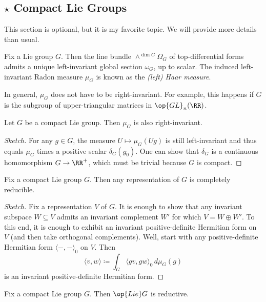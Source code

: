 \documentclass{article}
\begin{document}
\subsection{\texorpdfstring{$\star$}{\textasteriskcentered{}} Compact Lie Groups} \label{subsec:compact}
\begin{warn}
	This section is optional, but it is my favorite topic. We will provide more details than usual.
\end{warn}
\begin{definition}
	Fix a Lie group $G$. Then the line bundle $\land^{\dim G}\Omega_G$ of top-differential forms admits a unique left-invariant global section $\omega_G$, up to scalar. The induced left-invariant Radon measure $\mu_G$ is known as the \textit{(left) Haar measure}.
\end{definition}
\begin{example}
	In general, $\mu_G$ does not have to be right-invariant. For example, this happens if $G$ is the subgroup of upper-triangular matrices in $\op{GL}_n(\RR)$.
\end{example}
\begin{lemma}
	Let $G$ be a compact Lie group. Then $\mu_G$ is also right-invariant.
\end{lemma}
\begin{proof}[Sketch]
	For any $g\in G$, the measure $U\mapsto\mu_G(Ug)$ is still left-invariant and thus equals $\mu_G$ times a positive scalar $\delta_G(g_0)$. One can show that $\delta_G$ is a continuous homomorphism $G\to\RR^+$, which must be trivial because $G$ is compact.
\end{proof}
\begin{proposition} \label{prop:compact-reducible}
	Fix a compact Lie group $G$. Then any representation of $G$ is completely reducible.
\end{proposition}
\begin{proof}[Sketch]
	Fix a representation $V$ of $G$. It is enough to show that any invariant subspace $W\subseteq V$ admits an invariant complement $W'$ for which $V=W\oplus W'$. To this end, it is enough to exhibit an invariant positive-definite Hermitian form on $V$ (and then take orthogonal complements). Well, start with any positive-definite Hermitian form $\langle-,-\rangle_0$ on $V$. Then
	\[\langle v,w\rangle\coloneqq\int_G\langle gv,gw\rangle_0\,d\mu_G(g)\]
	is an invariant positive-definite Hermitian form.
\end{proof}
\begin{corollary}
	Fix a compact Lie group $G$. Then $\op{Lie}G$ is reductive.
\end{corollary}
\end{document}
